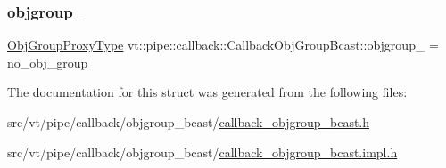 \subsubsection{\texorpdfstring{objgroup\+\_\+}{objgroup\_}}
{\footnotesize\ttfamily \hyperlink{namespacevt_ad7cae989df485fccca57f0792a880a8e}{Obj\+Group\+Proxy\+Type} vt\+::pipe\+::callback\+::\+Callback\+Obj\+Group\+Bcast\+::objgroup\+\_\+ = no\+\_\+obj\+\_\+group\hspace{0.3cm}{\ttfamily [private]}}



The documentation for this struct was generated from the following files\+:\begin{DoxyCompactItemize}
\item 
src/vt/pipe/callback/objgroup\+\_\+bcast/\hyperlink{callback__objgroup__bcast_8h}{callback\+\_\+objgroup\+\_\+bcast.\+h}\item 
src/vt/pipe/callback/objgroup\+\_\+bcast/\hyperlink{callback__objgroup__bcast_8impl_8h}{callback\+\_\+objgroup\+\_\+bcast.\+impl.\+h}\end{DoxyCompactItemize}
